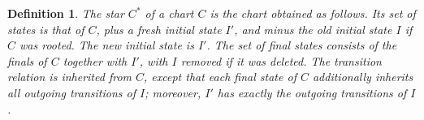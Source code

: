 \documentclass{article}
\newtheorem{definition}{Definition}[section]
\begin{document}

\begin{definition}
The star $C^{*}$ of a chart $C$ is the chart obtained as follows. 
Its set of states is that of $C$, plus a fresh initial state $I'$, and minus the old initial state $I$ if $C$ was rooted. 
The new initial state is $I'$. 
The set of final states consists of the finals of $C$ together with $I'$, with $I$ removed if it was deleted. 
The transition relation is inherited from $C$, except that each final state of $C$ additionally inherits all outgoing transitions of $I$; moreover, $I'$ has exactly the outgoing transitions of $I$.
\end{definition}
\end{document}
